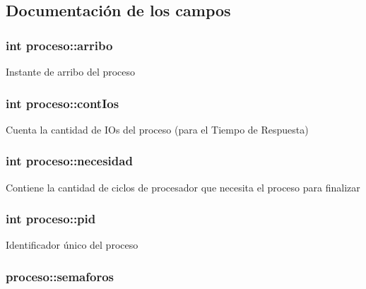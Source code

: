 \subsection{Documentación de los campos}
\hypertarget{structproceso_a658e84de456dc77674b4f1a69cfc0eca}{
\subsubsection[{arribo}]{\setlength{\rightskip}{0pt plus 5cm}int proceso\-::arribo}}\label{structproceso_a658e84de456dc77674b4f1a69cfc0eca}
Instante de arribo del proceso \hypertarget{structproceso_a55f899909bcb1ffc8b6c0d5e5eed0375}{
\subsubsection[{cont\-Ios}]{\setlength{\rightskip}{0pt plus 5cm}int proceso\-::cont\-Ios}}\label{structproceso_a55f899909bcb1ffc8b6c0d5e5eed0375}
Cuenta la cantidad de I\-Os del proceso (para el Tiempo de Respuesta) \hypertarget{structproceso_afa0af67b38696b6af251c7c6681a51bf}{
\subsubsection[{necesidad}]{\setlength{\rightskip}{0pt plus 5cm}int proceso\-::necesidad}}\label{structproceso_afa0af67b38696b6af251c7c6681a51bf}
Contiene la cantidad de ciclos de procesador que necesita el proceso para finalizar \hypertarget{structproceso_a358bdb0efc4a75e0a843429ef7dfc33e}{
\subsubsection[{pid}]{\setlength{\rightskip}{0pt plus 5cm}int proceso\-::pid}}\label{structproceso_a358bdb0efc4a75e0a843429ef7dfc33e}
Identificador único del proceso \hypertarget{structproceso_a969f47210353eb94475ffa944761943a}{
\subsubsection[{semaforos}]{ proceso\-::semaforos}}\label{structproceso_a969f47210353eb94475ffa944761943a}
